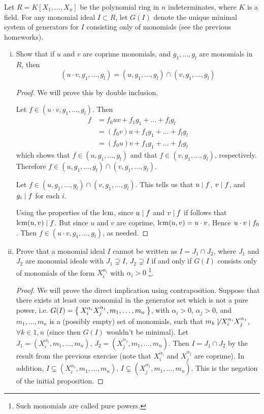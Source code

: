 \begin{problem*}{7}
Let \(R = K[X_1, \dots, X_n]\) be the polynomial ring in \(n\) indeterminates, where \(K\) is a field. For any monomial ideal \(I \subset R\), let \(G(I)\) denote the unique minimal system of generators for \(I\) consisting only of monomials (see the previous homeworks).
\begin{enumerate}[(i)]
    \item Show that if \(u\) and \(v\) are coprime monomials, and \(g_1, \dots, g_l\) are monomials in \(R\), then
    \[
        (u \cdot v, g_1, \dots, g_l) = (u, g_1, \dots, g_l) \cap (v, g_1, \dots, g_l)
    \]
    \begin{proof}
    We will prove this by double inclusion.
    
    Let \(f \in (u \cdot v, g_1, \dots, g_l)\). Then
    \begin{align*}
        f &= f_0 uv + f_1 g_1 + \dots + f_l g_l \\
        &= (f_0 v) u + f_1 g_1 + \dots + f_l g_l \\
        &= (f_0 u) v + f_1 g_1 + \dots + f_l g_l
    \end{align*}
    which shows that \(f \in (u, g_1, \dots, g_l)\) and that \(f \in (v, g_1, \dots, g_l)\), respectively. Therefore \(f \in (u, g_1, \dots, g_l) \cap (v, g_1, \dots, g_l)\).
    
    Let \(f \in (u, g_1, \dots, g_l) \cap (v, g_1, \dots, g_l)\). This tells us that \(u \mid f\), \(v \mid f\), and \(g_i \mid f\) for each \(i\).
    
    Using the properties of the \(\operatorname{lcm}\), since \(u \mid f\) and \(v \mid f\) if follows that \(\operatorname{lcm}(u, v) \mid f\). But since \(u\) and \(v\) are coprime, \(\operatorname{lcm}(u, v) = u \cdot v\). Hence \(u \cdot v \mid f_0\). Then \(f \in (u \cdot v, g_1, \dots, g_l)\), as needed.
    \end{proof}
    
    \item Prove that a monomial ideal \(I\) cannot be written as \(I = J_1 \cap J_2\), where \(J_1\) and \(J_2\) are monomial ideals with \(J_1 \supsetneq I\), \(J_2 \supsetneq I\) if and only if \(G(I)\) consists only of monomials of the form \(X_i^{\alpha_i}\) with \(\alpha_i > 0\) \footnote{Such monomials are called pure powers.}.
    \begin{proof}
    We will prove the direct implication using contraposition. Suppose that there exists at least one monomial in the generator set which is not a pure power, i.e. \(G(I) = \Set{ X_i^{\alpha_i} X_j^{\alpha_j}, m_1, \dots, m_n }\), with \(\alpha_i > 0\), \(\alpha_j > 0\), and \(m_1, \dots, m_n\) is a (possibly empty) set of monomials, such that \(m_k \not\mid X_i^{\alpha_i} X_j^{\alpha_j}\), \(\forall k \in \overline{1, n}\) (since then \(G(I)\) wouldn't be minimal). Let \(J_1 = (X_i^{\alpha_i}, m_1, \dots, m_n)\), \(J_2 = (X_j^{\alpha_j}, m_1, \dots, m_n)\). Then \(I = J_1 \cap J_2\) by the result from the previous exercise (note that \(X_i^{\alpha_i}\) and \(X_j^{\alpha_j}\) are coprime). In addition, \(I \subsetneq (X_i^{\alpha_i}, m_1, \dots, m_n)\), \(I \subsetneq (X_j^{\alpha_j}, m_1, \dots, m_n)\). This is the negation of the initial proposition.
    

\end{proof}
\end{enumerate}
\end{problem*}
